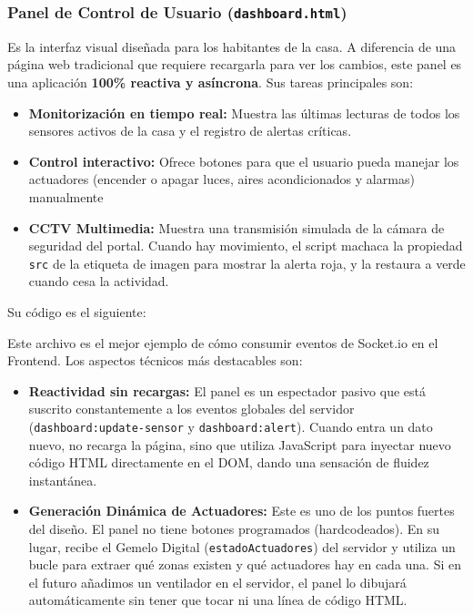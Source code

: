 \documentclass[a4paper,12pt]{article}
\begin{document}
			\subsubsection{Panel de Control de Usuario (\texttt{dashboard.html})}
				Es la interfaz visual diseñada para los habitantes de la casa. A diferencia de una página web tradicional que requiere recargarla para ver los cambios, este panel es una aplicación \textbf{100\% reactiva y asíncrona}. Sus tareas principales son:
				
				\begin{itemize}
					\item \textbf{Monitorización en tiempo real:} Muestra las últimas lecturas de todos los sensores activos de la casa y el registro de alertas críticas.
					\item \textbf{Control interactivo:} Ofrece botones para que el usuario pueda manejar los actuadores (encender o apagar luces, aires acondicionados y alarmas) manualmente
					\item \textbf{CCTV Multimedia:} Muestra una transmisión simulada de la cámara de seguridad del portal. Cuando hay movimiento, el script machaca la propiedad \texttt{src} de la etiqueta de imagen para mostrar la alerta roja, y la restaura a verde cuando cesa la actividad.
				\end{itemize}
				
				Su código es el siguiente:
				
				
				Este archivo es el mejor ejemplo de cómo consumir eventos de Socket.io en el Frontend. Los aspectos técnicos más destacables son:
				
				\begin{itemize}
					\item \textbf{Reactividad sin recargas:} El panel es un espectador pasivo que está suscrito constantemente a los eventos globales del servidor (\texttt{dashboard:update-sensor} y \texttt{dashboard:alert}). Cuando entra un dato nuevo, no recarga la página, sino que utiliza JavaScript para inyectar nuevo código HTML directamente en el DOM, dando una sensación de fluidez instantánea.
					
					\item \textbf{Generación Dinámica de Actuadores:} Este es uno de los puntos fuertes del diseño. El panel no tiene botones programados (hardcodeados). En su lugar, recibe el Gemelo Digital (\texttt{estadoActuadores}) del servidor y utiliza un bucle para extraer qué zonas existen y qué actuadores hay en cada una. Si en el futuro añadimos un ventilador en el servidor, el panel lo dibujará automáticamente sin tener que tocar ni una línea de código HTML.
				\end{itemize}
		
\end{document}
